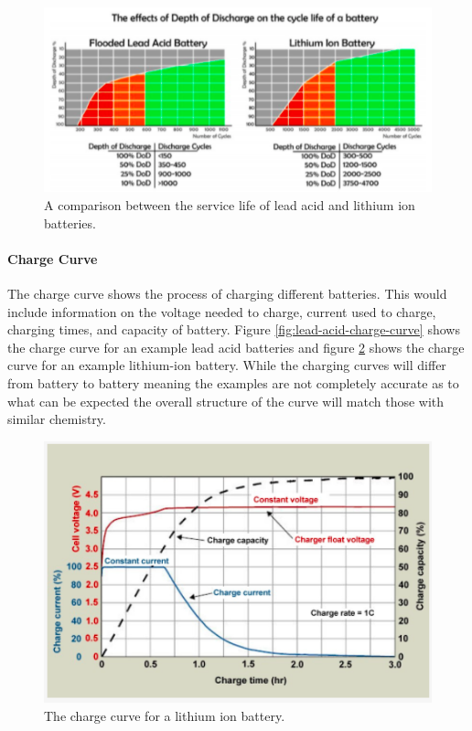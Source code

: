 \begin{figure}
    \centering
    \includegraphics[scale=0.5]{figures/service life.png}
    \caption{A comparison between the service life of lead acid and lithium ion batteries.}
    \label{fig:service-life} 
\end{figure}

\paragraph{Charge Curve}
The charge curve shows the process of charging different batteries. This would include information on the voltage needed to charge, current used to charge, charging times, and capacity of battery. Figure \ref{fig:lead-acid-charge-curve} shows the charge curve for an example lead acid batteries and figure \ref{fig:lithium-charge-curve} shows the charge curve for an example lithium-ion battery. While the charging curves will differ from battery to battery meaning the examples are not completely accurate as to what can be expected the overall structure of the curve will match those with similar chemistry.

\begin{figure}
    \centering
    \includegraphics[scale=0.5]{figures/lithium charge curve.png}
    \caption{The charge curve for a lithium ion battery.}
    \label{fig:lithium-charge-curve} 
\end{figure}

